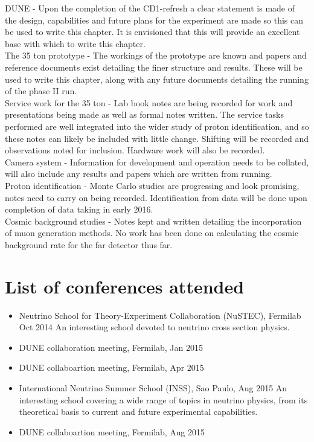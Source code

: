 \documentclass[11pt]{report} %
\begin{document}
{DUNE - Upon the completion of the CD1-refresh a clear statement is made of the design, capabilities and future plans for the experiment are made so this can be used to write this chapter. It is envisioned that this will provide an excellent base with which to write this chapter. \\

The 35 ton prototype - The workings of the prototype are known and papers and reference documents exist detailing the finer structure and results. These will be used to write this chapter, along with any future documents detailing the running of the phase II run. \\

Service work for the 35 ton - Lab book notes are being recorded for work and presentations being made as well as formal notes written. The service tasks performed are well integrated into the wider study of proton identification, and so these notes can likely be included with little change. Shifting will be recorded and observations noted for inclusion. Hardware work will also be recorded. \\

Camera system - Information for development and operation needs to be collated, will also include any results and papers which are written from running. \\

Proton identification - Monte Carlo studies are progressing and look promising, notes need to carry on being recorded. Identification from data will be done upon completion of data taking in early 2016. \\

Cosmic background studies - Notes kept and written detailing the incorporation of muon generation methods. No work has been done on calculating the cosmic background rate for the far detector thus far.

\section{List of conferences attended}
\begin{itemize}

\item Neutrino School for Theory-Experiment Collaboration (NuSTEC), Fermilab Oct 2014
  \subitem An interesting school devoted to neutrino cross section physics.
\item DUNE collaboration meeting, Fermilab, Jan 2015
\item DUNE collaboartion meeting, Fermilab, Apr 2015
\item International Neutrino Summer School (INSS), Sao Paulo, Aug 2015
  \subitem An interesting school covering a wide range of topics in neutrino physics, from its theoretical basis to current and future experimental capabilities. 
\item DUNE collaboartion meeting, Fermilab, Aug 2015


\end{itemize}}
\end{document}
